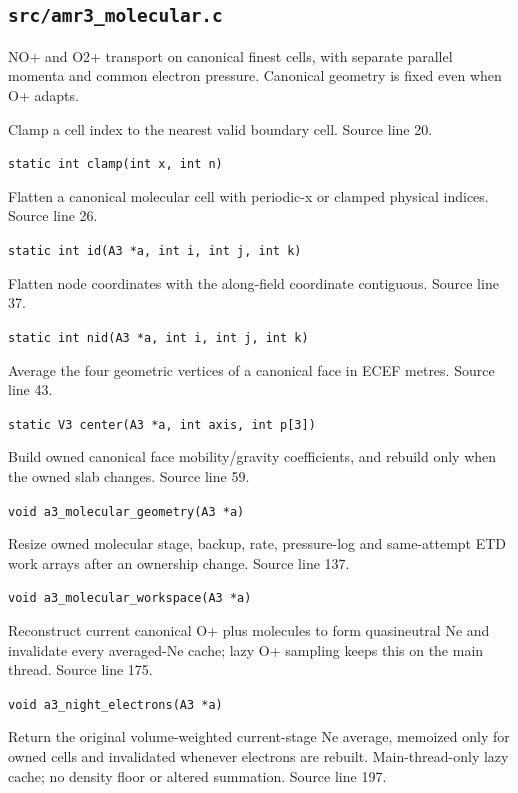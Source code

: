 \subsection{\texttt{src/amr3\_molecular.c}}
NO+ and O2+ transport on canonical finest cells, with separate parallel momenta and common electron pressure. Canonical geometry is fixed even when O+ adapts.
\begin{description}[style=nextline,leftmargin=0pt,labelindent=0pt,labelwidth=0pt,labelsep=0pt]
\item[\texttt{clamp}] Clamp a cell index to the nearest valid boundary cell. Source line 20.\par
{\small\nolinkurl{static int clamp(int x, int n)}}
\item[\texttt{id}] Flatten a canonical molecular cell with periodic-x or clamped physical indices. Source line 26.\par
{\small\nolinkurl{static int id(A3 *a, int i, int j, int k)}}
\item[\texttt{nid}] Flatten node coordinates with the along-field coordinate contiguous. Source line 37.\par
{\small\nolinkurl{static int nid(A3 *a, int i, int j, int k)}}
\item[\texttt{center}] Average the four geometric vertices of a canonical face in ECEF metres. Source line 43.\par
{\small\nolinkurl{static V3 center(A3 *a, int axis, int p[3])}}
\item[\texttt{a3\_molecular\_geometry}] Build owned canonical face mobility/gravity coefficients, and rebuild only when the owned slab changes. Source line 59.\par
{\small\nolinkurl{void a3_molecular_geometry(A3 *a)}}
\item[\texttt{a3\_molecular\_workspace}] Resize owned molecular stage, backup, rate, pressure-log and same-attempt ETD work arrays after an ownership change. Source line 137.\par
{\small\nolinkurl{void a3_molecular_workspace(A3 *a)}}
\item[\texttt{a3\_night\_electrons}] Reconstruct current canonical O+ plus molecules to form quasineutral Ne and invalidate every averaged-Ne cache; lazy O+ sampling keeps this on the main thread. Source line 175.\par
{\small\nolinkurl{void a3_night_electrons(A3 *a)}}
\item[\texttt{a3\_night\_electron}] Return the original volume-weighted current-stage Ne average, memoized only for owned cells and invalidated whenever electrons are rebuilt. Main-thread-only lazy cache; no density floor or altered summation. Source line 197.\par

\end{description}
